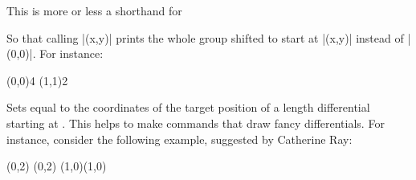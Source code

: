 \documentclass{ltxdoc}
\begin{document}
\begin{sseqdata}[name=ex1,degree={#1}{1-#1}]
\begin{command}{\sseqnewgroup{}}
This is more or less a shorthand for
\begin{codeexample}[code only, code=white]
\sseqnewcmd\opt{*}\cscolor{(\obscurexname,\obscureyname)}
\end{codeexample}
So that calling |\mygroup(x,y)| prints the whole group shifted to start at |(x,y)| instead of |(0,0)|. For instance:
\begin{codeexample}[width=8cm]
\sseqnewgroup*{}
\begin{sseqpage}
\tower[orange](0,0){4}
\tower[red](1,1){2}
\end{sseqpage}
\end{codeexample}
\end{command}

\begin{command}{\getdtarget{}}
Sets  equal to the coordinates of the target position of a length  differential starting at . This helps to make commands that draw fancy differentials. For instance, consider the following example, suggested by Catherine Ray:
\begin{codeexample}[]
\NewDocumentCommand{}
\begin{sseqdata}[name=cathex,Adams grading,differentials={blue}]
\class(0,2)
\class(0,2)
\class(1,0)\class(1,0)


\end{sseqdata}
\end{codeexample}
\end{command}
\end{sseqdata}
\end{document}
